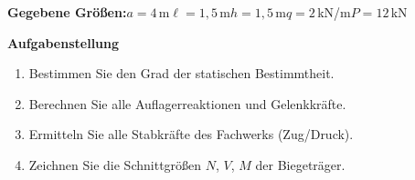 \documentclass[a4paper,11pt]{article}
\begin{document}
\textbf{Gegebene Größen:}\quad $a=4$\,m\quad $\ell=1,5$\,m\quad $h=1,5$\,m\quad $q=2$\,kN/m\quad $P=12$\,kN
\par\medskip
\textbf{Aufgabenstellung}\par
\begin{enumerate}[label=\textbf{\arabic*.}]
  \item Bestimmen Sie den Grad der statischen Bestimmtheit.
  \item Berechnen Sie alle Auflagerreaktionen und Gelenkkräfte.
  \item Ermitteln Sie alle Stabkräfte des Fachwerks (Zug/Druck).
  \item Zeichnen Sie die Schnittgrößen $N$, $V$, $M$ der Biegeträger.
\end{enumerate}
\end{document}
